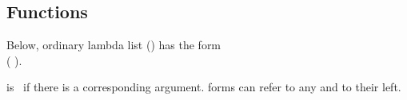 \subsection{Functions}
\label{section:Functions}

\begin{flushleft}
  Below, ordinary lambda list () has the form\\
  (
  ).
\end{flushleft}
 is \T\ if there is a corresponding
argument.  forms can refer to any  and
 to their left.


